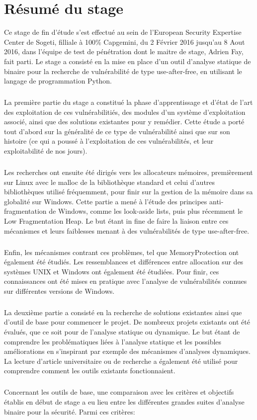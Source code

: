 \section*{Résumé du stage}
Ce stage de fin d'étude s'est effectué au sein de l'European Security Expertise Center de Sogeti, filliale à 100\% Capgemini, du 2 Février 2016 jusqu'au 8 Aout 2016, dans
l'équipe de test de pénétration dont le maitre de stage, Adrien Fay, fait parti. Le stage a consisté en la mise en place d'un outil d'analyse statique de binaire pour la recherche
de vulnérabilité de type use-after-free, en utilisant le langage de programmation Python.
\subparagraph{}
La première partie du stage a constitué la phase d'apprentissage et d'état de l'art des exploitation de ces vulnérabilitiés, des modules d'un système d'exploitation associé, ainsi que des solutions
existantes pour y remédier. Cette étude a porté tout d'abord sur la généralité de ce type de vulnérabilité ainsi que sur son histoire (ce qui a poussé à l'exploitation de ces vulnérabilités, et leur
exploitabilité de nos jours).
\subparagraph{}
Les recherches ont ensuite été dirigés vers les allocateurs mémoires, premièrement sur Linux avec le malloc de la bibliothèque standard et celui d'autres bibliothèques
utilisé fréquemment, pour finir sur la gestion de la mémoire dans sa globalité sur Windows. Cette partie a mené à l'étude des principes anti-fragmentation de Windows, comme les look-aside lists, puis
plus récemment le Low Fragmentation Heap. Le but étant in fine de faire la liaison entre ces mécanismes et leurs faiblesses menant à des vulnérabilités de type use-after-free.
\subparagraph{}
Enfin, les mécanismes contrant ces problèmes, tel que MemoryProtection ont également été étudiés. Les ressemblances et différences entre allocation sur des systèmes UNIX et Windows ont également
été étudiées. Pour finir, ces connaissances ont été mises en pratique avec l'analyse de vulnérabilités connues sur différentes versions de Windows.
\subparagraph{}
La deuxième partie a consisté en la recherche de solutions existantes ainsi que d'outil de base pour commencer le projet. De nombreux projets existants ont été évalués, que ce soit pour de l'analyse statique ou dynamique. Le but étant de comprendre les problématiques liées à l'analyse statique et les possibles améliorations en s'inspirant par exemple des mécanismes d'analyses dynamiques.
La lecture d'article universitaire ou de recherche a également été utilisé pour comprendre comment les outils existants fonctionnaient.
\subparagraph{}
Concernant les outils de base, une comparaison avec les critères et objectifs établis en début de stage a eu lieu entre les différentes grandes suites d'analyse binaire pour la sécurité. Parmi ces critères:
